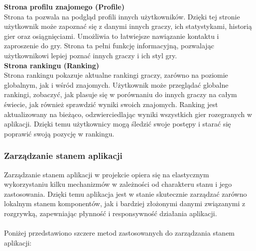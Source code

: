 \documentclass[12pt,a4paper]{article}
\begin{document}
\noindent \textbf{Strona profilu znajomego (Profile)}\\
Strona ta pozwala na podgląd profili innych użytkowników. Dzięki tej stronie użytkownik może zapoznać się z danymi innych graczy, ich statystykami, historią gier oraz osiągnięciami. Umożliwia to łatwiejsze nawiązanie kontaktu i zaproszenie do gry. Strona ta pełni funkcję informacyjną, pozwalając użytkownikowi lepiej poznać innych graczy i ich styl gry.
\\

\noindent \textbf{Strona rankingu (Ranking)}\\
Strona rankingu pokazuje aktualne rankingi graczy, zarówno na poziomie globalnym, jak i wśród znajomych. Użytkownik może przeglądać globalne rankingi, zobaczyć, jak plasuje się w porównaniu do innych graczy na całym świecie, jak również sprawdzić wyniki swoich znajomych. Ranking jest aktualizowany na bieżąco, odzwierciedlając wyniki wszystkich gier rozegranych w aplikacji. Dzięki temu użytkownicy mogą śledzić swoje postępy i starać się poprawić swoją pozycję w rankingu.

\newpage

\subsubsection{Zarządzanie stanem aplikacji}
Zarządzanie stanem aplikacji w projekcie opiera się na elastycznym wykorzystaniu kilku mechanizmów w zależności od charakteru stanu i jego zastosowania. Dzięki temu aplikacja jest w stanie skutecznie zarządzać zarówno lokalnym stanem komponentów, jak i bardziej złożonymi danymi związanymi z rozgrywką, zapewniając płynność i responsywność działania aplikacji.
\\\\
Poniżej przedstawiono szczere metod zastosowanych do zarządzania stanem aplikacji:
\end{document}
